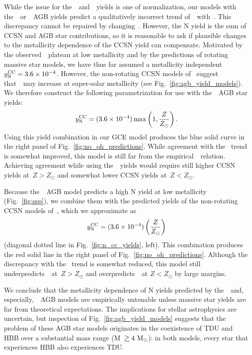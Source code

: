 \documentclass[ms.tex]{subfiles}
\begin{document}
While the issue for the~\cristallo~and~\ventura~yields is one of normalization,
our models with the~\karakasten~or~\karakas~AGB yields predict a
qualitatively incorrect trend of~\no~with~\oh.
This discrepancy cannot be repaired by changing~.
However, the N yield is the sum of CCSN and AGB star contributions, so it is
reasonable to ask if plausible changes to the metallicity dependence of the
CCSN yield can compensate.
Motivated by the observed~\no~plateau at low metallicity and by the predictions
of rotating massive star models, we have thus far assumed a metallicity
independent~$y_\text{N}^\text{CC} = 3.6\times10^{-4}$.
However, the non-rotating CCSN models of~\citet{Nomoto2013} suggest
that~~may increase at super-solar metallicity (see
Fig.~\ref{fig:agb_yield_models}).
We therefore construct the following parametrization for use with
the~\karakas~AGB star yields:
\begin{equation}
y_\text{N}^\text{CC} = (3.6\times10^{-4})\max\left(1, \frac{Z}{Z_\odot}\right).
\label{eq:broken_yncc}
\end{equation}
Using this yield combination in our GCE model produces the blue solid curve
in the right panel of Fig.~\ref{fig:no_oh_predictions}.
While agreement with the~\citet{Dopita2016} trend is somewhat improved, this
model is still far from the empirical~\ohno~relation.
Achieving agreement while using the~\karakas~yields would require still higher
CCSN yields at~$Z > Z_\odot$ and somewhat lower CCSN yields at~$Z < Z_\odot$.
\par
Because the~\karakasten~AGB model predicts a high N yield at low metallicity
(Fig.~\ref{fig:ssp}), we combine them with the predicted yields of the
non-rotating CCSN models of~\citet{Limongi2018}, which we approximate as
\begin{equation}
y_\text{N}^\text{CC} = (3.6\times10^{-4})\left(\frac{Z}{Z_\odot}\right)
\label{eq:linear_yncc}
\end{equation}
(diagonal dotted line in Fig.~\ref{fig:n_cc_yields}, left).
This combination produces the red solid line in the right panel of
Fig.~\ref{fig:no_oh_predictions}.
Although the discrepancy with the~\citet{Dopita2016} trend is somewhat reduced,
this model still underpredicts~\no~at~$Z > Z_\odot$ and overpredicts~\no~at
$Z < Z_\odot$ by large margins.
\par
We conclude that the metallicity dependence of N yields predicted by
the~\karakas~and, especially,~\karakasten~AGB models are empirically
untenable unless massive star yields are far from theoretical expectations.
The implications for stellar astrophysics are uncertain, but inspection of
Fig.~\ref{fig:agb_yield_models} suggests that the problem of these AGB star
models originates in the coexistence of TDU and HBB over a substantial
mass range (M~$\gtrsim 4~\text{M}_\odot$): in both models, every star that experiences
HBB also experiences TDU.
\end{document}
